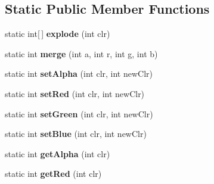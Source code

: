 \subsection*{Static Public Member Functions}
\begin{DoxyCompactItemize}
\item 
\hypertarget{classhype_1_1core_1_1util_1_1_h_colors_aef1d1dd5fa96b92704e0ec018dbe18a4}{static int\mbox{[}$\,$\mbox{]} {\bfseries explode} (int clr)}\label{classhype_1_1core_1_1util_1_1_h_colors_aef1d1dd5fa96b92704e0ec018dbe18a4}

\item 
\hypertarget{classhype_1_1core_1_1util_1_1_h_colors_a4d5b86639901a8fefb06f217a6bb0a67}{static int {\bfseries merge} (int a, int r, int g, int b)}\label{classhype_1_1core_1_1util_1_1_h_colors_a4d5b86639901a8fefb06f217a6bb0a67}

\item 
\hypertarget{classhype_1_1core_1_1util_1_1_h_colors_a9bfc91b7ebb8c1300087975915666dc7}{static int {\bfseries set\-Alpha} (int clr, int new\-Clr)}\label{classhype_1_1core_1_1util_1_1_h_colors_a9bfc91b7ebb8c1300087975915666dc7}

\item 
\hypertarget{classhype_1_1core_1_1util_1_1_h_colors_a3f9654e04c93e21f2fdac34f06764a02}{static int {\bfseries set\-Red} (int clr, int new\-Clr)}\label{classhype_1_1core_1_1util_1_1_h_colors_a3f9654e04c93e21f2fdac34f06764a02}

\item 
\hypertarget{classhype_1_1core_1_1util_1_1_h_colors_a85510120afd90433d7de37b8c178ad89}{static int {\bfseries set\-Green} (int clr, int new\-Clr)}\label{classhype_1_1core_1_1util_1_1_h_colors_a85510120afd90433d7de37b8c178ad89}

\item 
\hypertarget{classhype_1_1core_1_1util_1_1_h_colors_ab89a59c303631f022792144a5846124b}{static int {\bfseries set\-Blue} (int clr, int new\-Clr)}\label{classhype_1_1core_1_1util_1_1_h_colors_ab89a59c303631f022792144a5846124b}

\item 
\hypertarget{classhype_1_1core_1_1util_1_1_h_colors_a57e879bfafe888a80cd50d2c63f0606f}{static int {\bfseries get\-Alpha} (int clr)}\label{classhype_1_1core_1_1util_1_1_h_colors_a57e879bfafe888a80cd50d2c63f0606f}

\item 
\hypertarget{classhype_1_1core_1_1util_1_1_h_colors_a8e7a37a4e014078f84014ef97c3a4ce9}{static int {\bfseries get\-Red} (int clr)}\label{classhype_1_1core_1_1util_1_1_h_colors_a8e7a37a4e014078f84014ef97c3a4ce9}


\end{DoxyCompactItemize}
